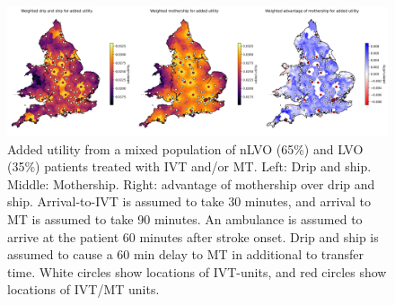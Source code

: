\begin{figure}
\centering
\includegraphics[width=1.0\textwidth]{./maps/added_utility_weighted_results}
\caption{Added utility from a mixed population of nLVO (65\%) and LVO (35\%) patients treated with IVT and/or MT. Left: Drip and ship. Middle: Mothership. Right: advantage of mothership over drip and ship. Arrival-to-IVT is assumed to take 30 minutes, and arrival to MT is assumed to take 90 minutes. An ambulance is assumed to arrive at the patient 60 minutes after stroke onset. Drip and ship is assumed to cause a 60 min delay to MT in additional to transfer time. White circles show locations of IVT-units, and red circles show locations of IVT/MT units.}
\label{fig:added_utility_six_in_one}
\end{figure}